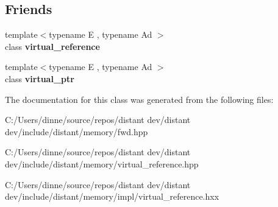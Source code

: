 \subsection*{Friends}
\begin{DoxyCompactItemize}
\item 
\mbox{\label{classdistant_1_1memory_1_1virtual__reference_acebd62ead6c46eaab65bf9900edf2492}} 
{\footnotesize template$<$typename E , typename Ad $>$ }\\class {\bfseries virtual\+\_\+reference}
\item 
\mbox{\label{classdistant_1_1memory_1_1virtual__reference_abd803c82999262af198dd4b0e0262801}} 
{\footnotesize template$<$typename E , typename Ad $>$ }\\class {\bfseries virtual\+\_\+ptr}
\end{DoxyCompactItemize}


The documentation for this class was generated from the following files\+:\begin{DoxyCompactItemize}
\item 
C\+:/\+Users/dinne/source/repos/distant dev/distant dev/include/distant/memory/fwd.\+hpp\item 
C\+:/\+Users/dinne/source/repos/distant dev/distant dev/include/distant/memory/virtual\+\_\+reference.\+hpp\item 
C\+:/\+Users/dinne/source/repos/distant dev/distant dev/include/distant/memory/impl/virtual\+\_\+reference.\+hxx\end{DoxyCompactItemize}
